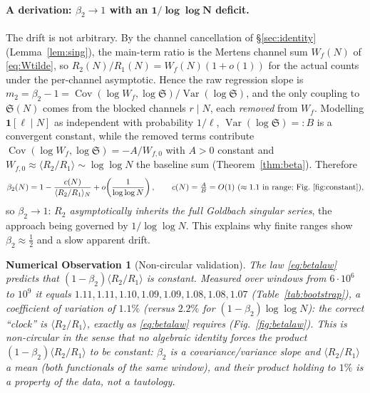 \documentclass[]{interact}%
\newtheorem{observation}{Numerical Observation}
\newcommand{\sing}{\mathfrak S}
\begin{document}
\paragraph{A derivation: $\beta_2\to1$ with an $\mathbf{1/\log\log N}$ deficit.}
The drift is not arbitrary. By the channel cancellation of \S\ref{sec:identity}
(Lemma~\ref{lem:sing}), the main-term ratio is the Mertens channel sum $W_f(N)$ of
\eqref{eq:Wtilde}, so $R_2(N)/R_1(N)=W_f(N)(1+o(1))$ for the actual counts under the per-channel
asymptotic. Hence the raw regression slope is
$m_2=\beta_2-1=\operatorname{Cov}(\log W_f,\log\sing)/\operatorname{Var}(\log\sing)$,
and the only coupling to $\sing(N)$ comes from the blocked channels $r\mid N$, each
\emph{removed} from $W_f$. Modelling $\mathbf 1[\ell\mid N]$ as independent
with probability $1/\ell$, $\operatorname{Var}(\log\sing)=:B$ is a convergent constant,
while the removed terms contribute
$\operatorname{Cov}(\log W_f,\log\sing)=-A/W_{f,0}$ with $A>0$
constant and $W_{f,0}\approx\langle R_2/R_1\rangle\sim\log\log N$ the baseline
sum (Theorem~\ref{thm:beta}). Therefore
\begin{equation}
  \beta_2(N)=1-\frac{c(N)}{\langle R_2/R_1\rangle_N}+o\!\left(\frac1{\log\log N}\right),
  \qquad c(N)=\tfrac{A}{B}=O(1)\ (\approx1.1\text{ in range; Fig.~\ref{fig:constant}}),
  \label{eq:betalaw}
\end{equation}
so $\beta_2\to1$: \emph{$R_2$ asymptotically inherits the full Goldbach singular
series}, the approach being governed by $1/\log\log N$. This explains why finite
ranges show $\beta_2\approx\tfrac12$ and a slow apparent drift.

\begin{observation}[Non-circular validation]\label{obs:validation}
The law \eqref{eq:betalaw} predicts that $(1-\beta_2)\langle R_2/R_1\rangle$ is
constant. Measured over windows from $6\cdot10^{6}$ to $10^{9}$ it equals
$1.11,1.11,1.10,1.09,1.09,1.08,1.08,1.07$ (Table~\ref{tab:bootstrap}), a coefficient of
variation of $1.1\%$ (versus $2.2\%$ for $(1-\beta_2)\log\log N$): the correct ``clock'' is
$\langle R_2/R_1\rangle$, exactly as \eqref{eq:betalaw} requires
(Fig.~\ref{fig:betalaw}). This is non-circular in the sense that no algebraic identity forces the
product $(1-\beta_2)\langle R_2/R_1\rangle$ to be constant: $\beta_2$ is a covariance/variance
slope and $\langle R_2/R_1\rangle$ a mean (both functionals of the same window), and their product
holding to $1\%$ is a property of the data, not a tautology.
\end{observation}
\end{document}
